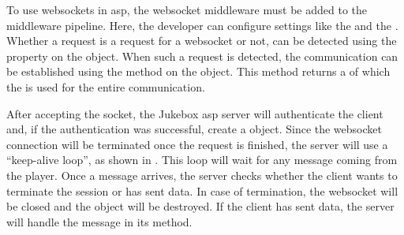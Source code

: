 

To use websockets in \gls{asp}, the websocket middleware must be added to the middleware pipeline. Here, the developer can configure settings like the  and the . Whether a request is a request for a websocket or not, can be detected using the  property on the  object. When such a request is detected, the communication can be established using the  method on the  object. This method returns a  of which the  is used for the entire communication. \cite{aspWebsockets}

After accepting the socket, the Jukebox \gls{asp} server will authenticate the client and, if the authentication was successful, create a  object. Since the websocket connection will be terminated once the request is finished, the server will use a \enquote{keep-alive loop}, as shown in . This loop will wait for any message coming from the player. Once a message arrives, the server checks whether the client wants to terminate the session or has sent data. In case of termination, the websocket will be closed and the  object will be destroyed. If the client has sent data, the server will handle the message in its  method.

\newpage


